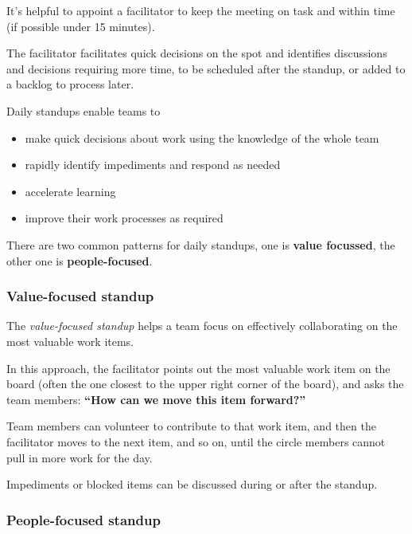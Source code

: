 It's helpful to appoint a facilitator to keep the meeting on task and within time (if possible under 15 minutes).

The facilitator facilitates quick decisions on the spot and identifies discussions and decisions requiring more time, to be scheduled after the standup, or added to a backlog to process later.

Daily standups enable teams to

\begin{itemize}
\item make quick decisions about work using the knowledge of the whole team

\item rapidly identify impediments and respond as needed

\item accelerate learning

\item improve their work processes as required

\end{itemize}

There are two common patterns for daily standups, one is \textbf{value focussed}, the other one is \textbf{people-focused}.

\subsubsection{Value-focused standup}
\label{value-focusedstandup}

The \emph{value-focused standup} helps a team focus on effectively collaborating on the most valuable work items.

In this approach, the facilitator points out the most valuable work item on the board (often the one closest to the upper right corner of the board), and asks the team members: \textbf{``How can we move this item forward?''}

Team members can volunteer to contribute to that work item, and then the facilitator moves to the next item, and so on, until the circle members cannot pull in more work for the day.

Impediments or blocked items can be discussed during or after the standup.

\subsubsection{People-focused standup}
\label{people-focusedstandup}

